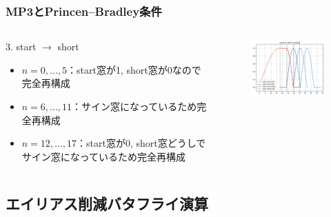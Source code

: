 \documentclass[14pt,xcolor=dvipsnames,table,dvipdfmx]{beamer}
\begin{document}
\begin{frame}[c]
    \frametitle{MP3とPrincen--Bradley条件}
    \begin{columns}
        \begin{column}{0.45\textwidth}
            3. start $\rightarrow$ short
            \begin{itemize}
                \item $n = 0,...,5$：start窓が1, short窓が0なので完全再構成
                \item $n = 6,...,11$：サイン窓になっているため完全再構成
                \item $n = 12,...,17$：start窓が0, short窓どうしでサイン窓になっているため完全再構成
            \end{itemize}
        \end{column}
        \begin{column}{0.55\textwidth}
            \begin{figure}
                \includegraphics[width=68mm]{./figs/start_to_short_window.pdf}
            \end{figure}
        \end{column}
    \end{columns}
\end{frame}

\subsection{エイリアス削減バタフライ演算}
\end{document}

